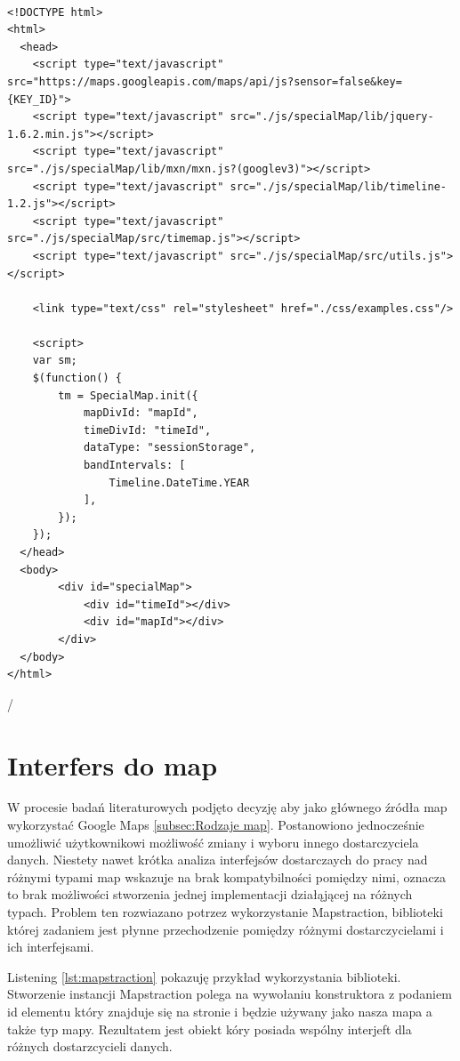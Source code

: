 \lstset{language=JavaScript}
\begin{lstlisting}[label={lst:minconf},caption={Minimalna konfiguracja.}]

<!DOCTYPE html>
<html>
  <head>
    <script type="text/javascript" src="https://maps.googleapis.com/maps/api/js?sensor=false&key={KEY_ID}">
    <script type="text/javascript" src="./js/specialMap/lib/jquery-1.6.2.min.js"></script>
    <script type="text/javascript" src="./js/specialMap/lib/mxn/mxn.js?(googlev3)"></script>
    <script type="text/javascript" src="./js/specialMap/lib/timeline-1.2.js"></script>
    <script type="text/javascript" src="./js/specialMap/src/timemap.js"></script>
    <script type="text/javascript" src="./js/specialMap/src/utils.js"></script>

    <link type="text/css" rel="stylesheet" href="./css/examples.css"/>

    <script>
    var sm;
    $(function() {
        tm = SpecialMap.init({
            mapDivId: "mapId",
            timeDivId: "timeId",
            dataType: "sessionStorage",
            bandIntervals: [
	            Timeline.DateTime.YEAR
	        ],
        });
    });
  </head>
  <body>
        <div id="specialMap">
            <div id="timeId"></div>
            <div id="mapId"></div>
        </div>
  </body>
</html>
\end{lstlisting}/


\section{Interfers do map}
\label{sec:mxn}

W procesie badań literaturowych podjęto decyzję aby jako głównego źródła map wykorzystać Google Maps \ref{subsec:Rodzaje map}. Postanowiono jednocześnie umożliwić użytkownikowi możliwość zmiany i wyboru innego dostarczyciela danych. Niestety nawet krótka analiza interfejsów dostarczaych do pracy nad różnymi typami map wskazuje na brak kompatybilności pomiędzy nimi, oznacza to brak możliwości stworzenia jednej implementacji działąjącej na różnych typach. Problem ten rozwiazano potrzez wykorzystanie Mapstraction, biblioteki której zadaniem jest płynne przechodzenie pomiędzy różnymi dostarczycielami i ich interfejsami.

Listening \ref{lst:mapstraction} pokazuję przykład wykorzystania biblioteki. Stworzenie instancji Mapstraction polega na wywołaniu konstruktora z podaniem id elementu który znajduje się na stronie i będzie używany jako nasza mapa a także typ mapy. Rezultatem jest obiekt kóry posiada wspólny interjeft dla różnych dostarzcycieli danych.


